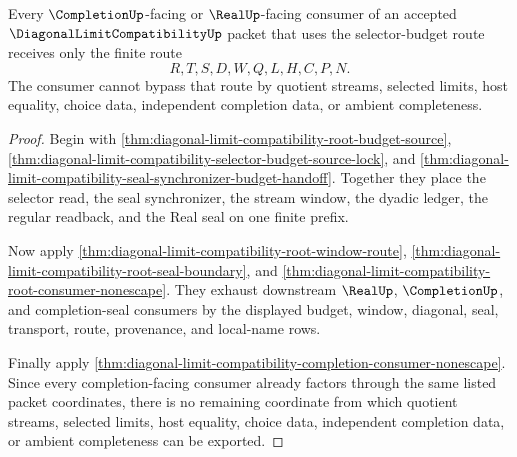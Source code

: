 \begin{theorem}
\label{thm:diagonal-limit-compatibility-completion-consumer-budget-nonescape}
Every $\CompletionUp$-facing or $\RealUp$-facing consumer of an accepted $\DiagonalLimitCompatibilityUp$ packet that uses the selector-budget route receives only the finite route
$$
R,T,S,D,W,Q,L,H,C,P,N .
$$
The consumer cannot bypass that route by quotient streams, selected limits, host equality, choice data, independent completion data, or ambient completeness.
\end{theorem}
\begin{proof}
Begin with \autoref{thm:diagonal-limit-compatibility-root-budget-source}, \autoref{thm:diagonal-limit-compatibility-selector-budget-source-lock}, and \autoref{thm:diagonal-limit-compatibility-seal-synchronizer-budget-handoff}. Together they place the selector read, the seal synchronizer, the stream window, the dyadic ledger, the regular readback, and the Real seal on one finite prefix.

Now apply \autoref{thm:diagonal-limit-compatibility-root-window-route}, \autoref{thm:diagonal-limit-compatibility-root-seal-boundary}, and \autoref{thm:diagonal-limit-compatibility-root-consumer-nonescape}. They exhaust downstream $\RealUp$, $\CompletionUp$, and completion-seal consumers by the displayed budget, window, diagonal, seal, transport, route, provenance, and local-name rows.

Finally apply \autoref{thm:diagonal-limit-compatibility-completion-consumer-nonescape}. Since every completion-facing consumer already factors through the same listed packet coordinates, there is no remaining coordinate from which quotient streams, selected limits, host equality, choice data, independent completion data, or ambient completeness can be exported.
\end{proof}

